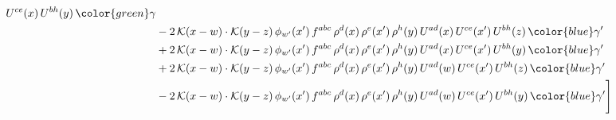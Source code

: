 \begin{align}
U^{ce}(x)\, U^{bh}(y)\, {\color{green} \gamma}\notag \\ & -2\,\mathcal{K}(x-w)\cdot \mathcal{K}(y-z)\, \mathcal{\phi}_{w'}(x')\, f^{abc}\, \rho^{d}(x)\,\rho^{e}(x')\,\rho^{h}(y)\, U^{ad}(x)\, U^{ce}(x')\, U^{bh}(z)\, {\color{blue} \gamma'}\notag \\ & +2\,\mathcal{K}(x-w)\cdot \mathcal{K}(y-z)\, \mathcal{\phi}_{w'}(x')\, f^{abc}\, \rho^{d}(x)\,\rho^{e}(x')\,\rho^{h}(y)\, U^{ad}(x)\, U^{ce}(x')\, U^{bh}(y)\, {\color{blue} \gamma'}\notag \\ & +2\,\mathcal{K}(x-w)\cdot \mathcal{K}(y-z)\, \mathcal{\phi}_{w'}(x')\, f^{abc}\, \rho^{d}(x)\,\rho^{e}(x')\,\rho^{h}(y)\, U^{ad}(w)\, U^{ce}(x')\, U^{bh}(z)\, {\color{blue} \gamma'}\notag \\ & -2\,\mathcal{K}(x-w)\cdot \mathcal{K}(y-z)\, \mathcal{\phi}_{w'}(x')\, f^{abc}\, \rho^{d}(x)\,\rho^{e}(x')\,\rho^{h}(y)\, U^{ad}(w)\, U^{ce}(x')\, U^{bh}(y)\, {\color{blue} \gamma'}\Bigg]
\end{align}
